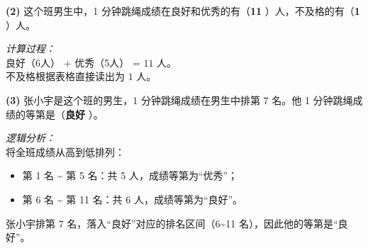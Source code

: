 {\small
\textbf{(2)} 这个班男生中，1 分钟跳绳成绩在良好和优秀的有（\quad \textbf{11} \quad）人，不及格的有（\quad \textbf{1} \quad）人。

\vspace{0.2cm}
\textit{计算过程：} \\
良好（6人） + 优秀（5人） = $11$ 人。\\
不及格根据表格直接读出为 $1$ 人。

\vspace{0.6cm}
\textbf{(3)} 张小宇是这个班的男生，1 分钟跳绳成绩在男生中排第 7 名。他 1 分钟跳绳成绩的等第是（\quad \textbf{良好} \quad）。

\vspace{0.2cm}
\textit{逻辑分析：} \\
将全班成绩从高到低排列：
\begin{itemize}
  \item 第 1 名 \textasciitilde{} 第 5 名：共 5 人，成绩等第为“优秀”；
  \item 第 6 名 \textasciitilde{} 第 11 名：共 6 人，成绩等第为“良好”。
\end{itemize}
张小宇排第 7 名，落入“良好”对应的排名区间（6\textasciitilde11 名），因此他的等第是“良好”。
}


